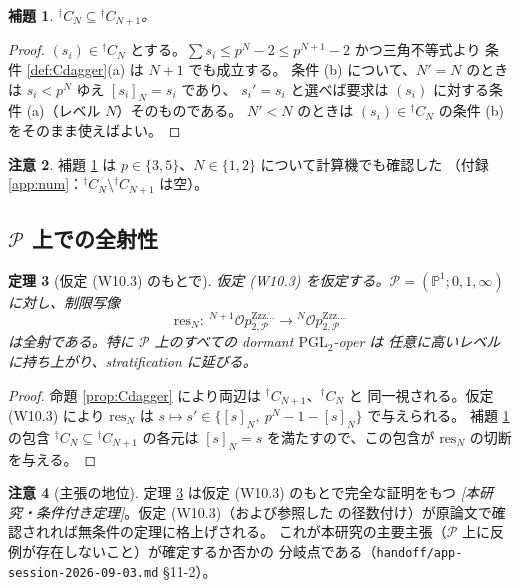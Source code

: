 \documentclass[a4paper,11pt]{ltjsarticle}
\theoremstyle{plain}
\newtheorem{theorem}{定理}[section]
\newtheorem{lemma}[theorem]{補題}
\theoremstyle{definition}
\newtheorem{remark}[theorem]{注意}
\newcommand{\bbP}{\mathbb{P}}
\newcommand{\sP}{\mathscr{P}}
\newcommand{\Op}{\mathcal{O}p}
\newcommand{\Zzz}{\mathrm{Zzz\dots}}
\begin{document}
\begin{lemma}\label{lem:nesting}
${}^{\dagger}C_N\subseteq{}^{\dagger}C_{N+1}$。
\end{lemma}

\begin{proof}
$(s_i)\in{}^{\dagger}C_N$ とする。$\sum s_i\le p^N-2\le p^{N+1}-2$ かつ三角不等式より
条件 \ref{def:Cdagger}(a) は $N+1$ でも成立する。
条件 (b) について、$N'=N$ のときは $s_i<p^N$ ゆえ $[s_i]_N=s_i$ であり、
$s_i'=s_i$ と選べば要求は $(s_i)$ に対する条件 (a)（レベル $N$）そのものである。
$N'<N$ のときは $(s_i)\in{}^{\dagger}C_N$ の条件 (b) をそのまま使えばよい。
\end{proof}

\begin{remark}
補題 \ref{lem:nesting} は $p\in\{3,5\}$、$N\in\{1,2\}$ について計算機でも確認した
（付録 \ref{app:num}：${}^{\dagger}C_N\setminus{}^{\dagger}C_{N+1}$ は空）。
\end{remark}

\subsection{$\sP$ 上での全射性}

\begin{theorem}[仮定 (W10.3) のもとで]\label{thm:M03}
仮定 (W10.3) を仮定する。$\sP=(\bbP^1;0,1,\infty)$ に対し、制限写像
\[
  \mathrm{res}_N:\ {}^{N+1}\Op^{\Zzz}_{2,\sP}\longrightarrow{}^{N}\Op^{\Zzz}_{2,\sP}
\]
は全射である。特に $\sP$ 上のすべての dormant $\mathrm{PGL}_2$-oper は
任意に高いレベルに持ち上がり、stratification に延びる。
\end{theorem}

\begin{proof}
命題 \ref{prop:Cdagger} により両辺は ${}^{\dagger}C_{N+1}$、${}^{\dagger}C_N$ と
同一視される。仮定 (W10.3) により $\mathrm{res}_N$ は
$s\mapsto s'\in\{[s]_N,\ p^N-1-[s]_N\}$ で与えられる。
補題 \ref{lem:nesting} の包含 ${}^{\dagger}C_N\subseteq{}^{\dagger}C_{N+1}$ の各元は
$[s]_N=s$ を満たすので、この包含が $\mathrm{res}_N$ の切断を与える。
\end{proof}

\begin{remark}[主張の地位]\label{rem:M03-status}
定理 \ref{thm:M03} は仮定 (W10.3) のもとで完全な証明をもつ
\emph{[本研究・条件付き定理]}。仮定 (W10.3)（および参照した \cite{Wak2}
の径数付け）が原論文で確認されれば無条件の定理に格上げされる。
これが本研究の主要主張（$\sP$ 上に反例が存在しないこと）が確定するか否かの
分岐点である（\texttt{handoff/app-session-2026-09-03.md} \S11-2）。
\end{remark}
\end{document}
